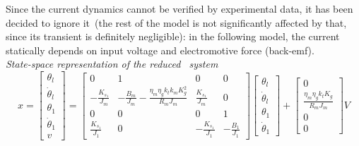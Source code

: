 Since the current dynamics cannot be verified by experimental data, it has been decided to ignore it~(the rest of the model is not significantly affected by that, since its transient is definitely negligible): in the following model, the current statically depends on input voltage and electromotive force (back-emf). \\

\noindent \textit{State-space representation of the reduced \onedof\ system}
\begin{equation}
	x =
	\begin{bmatrix}
		\theta_l \\
		\dot{\theta}_l \\
		{\theta}_1 \\
		\dot{\theta}_1 \\
		v
	\end{bmatrix}
	=
	\begin{bmatrix}
		0 &1 & 0 & 0 \\
		-\frac{K_{s_1}}{J_m} & -\frac{B_m}{J_m}-\frac{\eta_m \eta_g k_t k_m K^2_g}{R_m J_m}  & \frac{K_{s_1}}{J_m} & 0 \\
		0 & 0 & 0 & 1 \\
		\frac{K_{s_1}}{J_1} & 0 & -\frac{K_{s_1}}{J_1} & -\frac{B_1}{J_1}
	\end{bmatrix}
	\begin{bmatrix}
		\theta_l \\
		\dot{\theta}_l \\
		\theta_1 \\
		\dot{\theta}_1
	\end{bmatrix}
	+
	\begin{bmatrix}
		0 \\
		\frac{\eta_m \eta_g k_t K_g}{R_m J_m} \\
		0 \\
		0
	\end{bmatrix}
	V
\end{equation}

